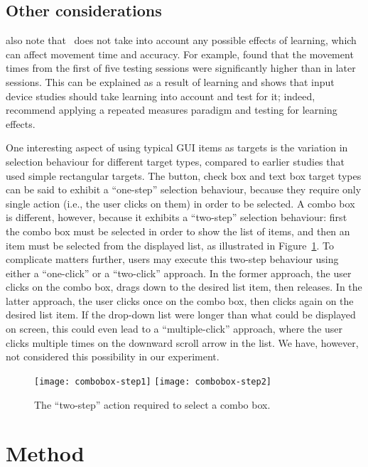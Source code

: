 \documentclass{elsart}
\begin{document}
\subsection{Other considerations}
\label{sec-evaluation-other}

\citet{Doug-SA-1999-CHI} also note that \ISOnine\ does not take into
account any possible effects of learning, which can affect movement time
and accuracy. For example, \citet{Mack-IS-1991} found that the movement
times from the first of five testing sessions were significantly higher
than in later sessions. This can be explained as a result of learning
and shows that input device studies should take learning into account
and test for it; indeed, \citet{Doug-SA-1999-CHI} recommend applying a
repeated measures paradigm and testing for learning effects.

One interesting aspect of using typical GUI items as targets is the
variation in selection behaviour for different target types, compared to
earlier studies that used simple rectangular targets. The button, check
box and text box target types can be said to exhibit a ``one-step''
selection behaviour, because they require only single action (i.e., the
user clicks on them) in order to be selected. A combo box is different,
however, because it exhibits a ``two-step'' selection behaviour: first
the combo box must be selected in order to show the list of items, and
then an item must be selected from the displayed list, as illustrated in
Figure~\ref{fig-combo-box}. To complicate matters further, users may
execute this two-step behaviour using either a ``one-click'' or a
``two-click'' approach. In the former approach, the user clicks on the
combo box, drags down to the desired list item, then releases. In the
latter approach, the user clicks once on the combo box, then clicks
again on the desired list item. If the drop-down list were longer than
what could be displayed on screen, this could even lead to a
``multiple-click'' approach, where the user clicks multiple times on the
downward scroll arrow in the list. We have, however, not considered this
possibility in our experiment.


\begin{figure}
	\centering
	\texttt{[image: combobox-step1]}\quad\quad\quad
	\texttt{[image: combobox-step2]}
	\caption{The ``two-step'' action required to select a combo box.}
	\label{fig-combo-box}
\end{figure}



\section{Method}
\label{sec-method}
\end{document}
